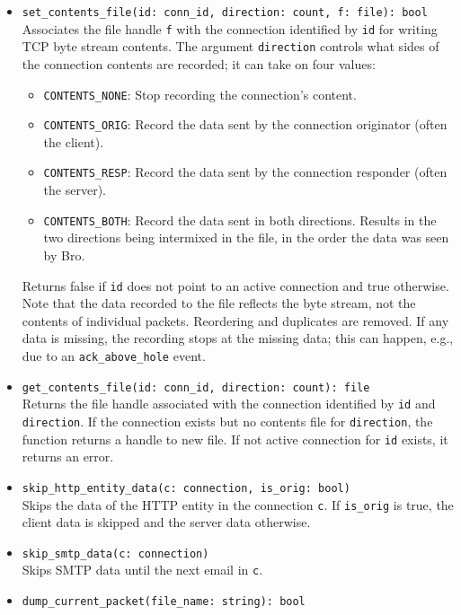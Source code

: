 \documentclass[10pt,landscape]{article}
\begin{document}
\begin{multicols*}{2}
\begin{itemize}
  \item \verb|set_contents_file(id: conn_id, direction: count, f: file): bool|\\
    Associates the file handle \verb|f| with the connection identified by
    \verb|id| for writing TCP byte stream contents. The argument
    \verb|direction| controls what sides of the connection contents are
    recorded; it can take on four values:
    \begin{itemize}
      \item \verb|CONTENTS_NONE|: Stop recording the connection's content.
      \item \verb|CONTENTS_ORIG|: Record the data sent by the connection
        originator (often the client).
      \item \verb|CONTENTS_RESP|: Record the data sent by the connection
        responder (often the server).
      \item \verb|CONTENTS_BOTH|: Record the data sent in both directions.
        Results in the two directions being intermixed in the file, in the
        order the data was seen by Bro.
    \end{itemize}
    Returns false if \verb|id| does not point to an active connection and
    true otherwise. Note that the data recorded to the file reflects the byte
    stream, not the contents of individual packets. Reordering and duplicates
    are removed. If any data is missing, the recording stops at the missing
    data; this can happen, e.g., due to an \verb|ack_above_hole| event.
  \item \verb|get_contents_file(id: conn_id, direction: count): file|\\
    Returns the file handle associated with the connection identified by
    \texttt{id} and \texttt{direction}. If the connection exists but no
    contents file for \texttt{direction}, the function returns a handle to new
    file. If not active connection for \texttt{id} exists, it returns an error.
  \item \verb|skip_http_entity_data(c: connection, is_orig: bool)|\\
    Skips the data of the HTTP entity in the connection \texttt{c}. If
    \verb|is_orig| is true, the client data is skipped and the server data
    otherwise.
  \item \verb|skip_smtp_data(c: connection)|\\
    Skips SMTP data until the next email in \texttt{c}.
  \item \verb|dump_current_packet(file_name: string): bool|\\

\end{itemize}
\end{multicols*}
\end{document}
